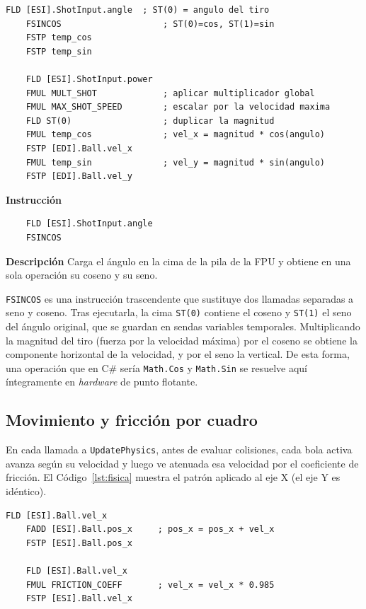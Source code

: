 \documentclass[a4paper,12pt]{article}
\begin{document}
\begin{lstlisting}[style=assemblyStyle, caption={Conversión de ángulo y fuerza en velocidad con \texttt{FSINCOS}.}, label={lst:applyshot}]
    FLD [ESI].ShotInput.angle  ; ST(0) = angulo del tiro
    FSINCOS                    ; ST(0)=cos, ST(1)=sin
    FSTP temp_cos
    FSTP temp_sin

    FLD [ESI].ShotInput.power
    FMUL MULT_SHOT             ; aplicar multiplicador global
    FMUL MAX_SHOT_SPEED        ; escalar por la velocidad maxima
    FLD ST(0)                  ; duplicar la magnitud
    FMUL temp_cos              ; vel_x = magnitud * cos(angulo)
    FSTP [EDI].Ball.vel_x
    FMUL temp_sin              ; vel_y = magnitud * sin(angulo)
    FSTP [EDI].Ball.vel_y
\end{lstlisting}

\begin{instruccionbox}
\textbf{Instrucción}
\begin{lstlisting}
    FLD [ESI].ShotInput.angle
    FSINCOS
\end{lstlisting}
\textbf{Descripción}
Carga el ángulo en la cima de la pila de la FPU y obtiene en una sola operación su coseno y su seno.
\end{instruccionbox}

\texttt{FSINCOS} es una instrucción trascendente que sustituye dos llamadas separadas a seno y coseno. Tras ejecutarla, la cima \texttt{ST(0)} contiene el coseno y \texttt{ST(1)} el seno del ángulo original, que se guardan en sendas variables temporales. Multiplicando la magnitud del tiro (fuerza por la velocidad máxima) por el coseno se obtiene la componente horizontal de la velocidad, y por el seno la vertical. De esta forma, una operación que en C\# sería \texttt{Math.Cos} y \texttt{Math.Sin} se resuelve aquí íntegramente en \textit{hardware} de punto flotante.

\subsection{Movimiento y fricción por cuadro}
En cada llamada a \texttt{UpdatePhysics}, antes de evaluar colisiones, cada bola activa avanza según su velocidad y luego ve atenuada esa velocidad por el coeficiente de fricción. El Código~\ref{lst:fisica} muestra el patrón aplicado al eje X (el eje Y es idéntico).

\begin{lstlisting}[style=assemblyStyle, caption={Integración de la posición y aplicación de la fricción.}, label={lst:fisica}]
    FLD [ESI].Ball.vel_x
    FADD [ESI].Ball.pos_x     ; pos_x = pos_x + vel_x
    FSTP [ESI].Ball.pos_x

    FLD [ESI].Ball.vel_x
    FMUL FRICTION_COEFF       ; vel_x = vel_x * 0.985
    FSTP [ESI].Ball.vel_x
\end{lstlisting}
\end{document}

